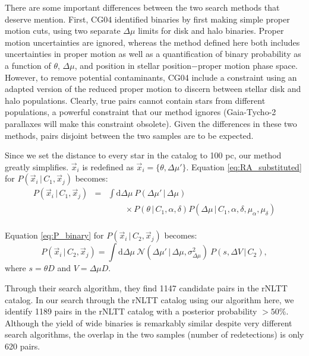 \documentclass[usenatbib]{mnras}
\newcommand{\given}{\,|\,}
\newcommand{\dd}{\mathrm{d}}
\begin{document}
There are some important differences between the two search methods that deserve mention. First, CG04 identified binaries by first making simple proper motion cuts, using two separate $\Delta \mu$ limits for disk and halo binaries. Proper motion uncertainties are ignored, whereas the method defined here both includes uncertainties in proper motion as well as a quantification of binary probability as a function of $\theta$, $\Delta \mu$, and position in stellar position$-$proper motion phase space. However, to remove potential contaminants, CG04 include a constraint using an adapted version of the reduced proper motion to discern between stellar disk and halo populations. 
Clearly, true pairs cannot contain stars from different populations, a powerful constraint that our method ignores (Gaia-Tycho-2 parallaxes will make this constraint obsolete). Given the differences in these two methods, pairs disjoint between the two samples are to be expected.



Since we set the distance to every star in the catalog to 100 pc, our method greatly simplifies. $\vec{x}_i$ is redefined as $\vec{x}_i = \{ \theta, \Delta \mu' \}$. Equation \ref{eq:RA_substituted} for $P(\vec{x}_i \given C_1, \vec{x}_j)$ becomes:
\begin{eqnarray}
P(\vec{x}_i \given C_1, \vec{x}_j) &=& \int \dd \Delta \mu\ P(\Delta \mu' \given \Delta \mu)\nonumber \\
& & \qquad \times P(\theta \given C_1, \alpha, \delta) P(\Delta \mu \given C_1, \alpha, \delta, \mu_{\alpha}, \mu_{\delta}) \nonumber \\
\label{eq:P_random_NLTT}
\end{eqnarray}


Equation \ref{eq:P_binary} for $P(\vec{x}_i \given C_2, \vec{x}_j)$ becomes:
\begin{equation}
P(\vec{x}_i \given C_2, \vec{x}_j) = \int \dd \Delta \mu\ 
\mathcal{N}( \Delta \mu' \given \Delta \mu, \sigma^2_{\Delta \mu} )\
P(s, \Delta V \given C_2),
\label{eq:P_binary_rNLTT}
\end{equation}
where $s = \theta D$ and $V = \Delta \mu D$. 


Through their search algorithm, they find 1147 candidate pairs in the rNLTT catalog. In our search through the rNLTT catalog using our algorithm here, we identify 1189 pairs in the rNLTT catalog with a posterior probability $>50$\%. Although the yield of wide binaries is remarkably similar despite very different search algorithms, the overlap in the two samples (number of redetections) is only 620 pairs. 
\end{document}
